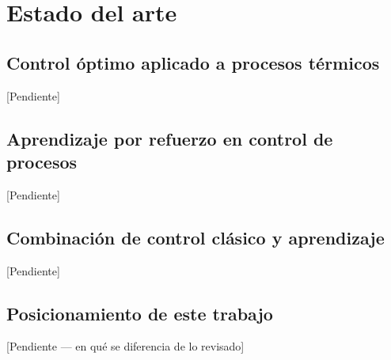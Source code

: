 \chapter{Estado del arte}
\label{cap:estado_del_arte}

\section{Control óptimo aplicado a procesos térmicos}
[Pendiente]

\section{Aprendizaje por refuerzo en control de procesos}
[Pendiente]

\section{Combinación de control clásico y aprendizaje}
[Pendiente]

\section{Posicionamiento de este trabajo}
[Pendiente — en qué se diferencia de lo revisado]
